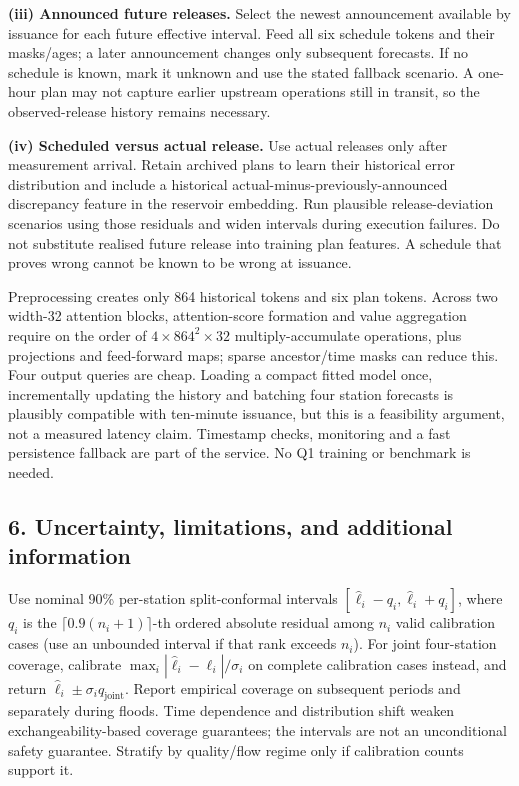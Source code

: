 \documentclass[
  10pt,
  a4paper,
]{article}
\begin{document}
\textbf{(iii) Announced future releases.} Select the newest announcement
available by issuance for each future effective interval. Feed all six
schedule tokens and their masks/ages; a later announcement changes only
subsequent forecasts. If no schedule is known, mark it unknown and use
the stated fallback scenario. A one-hour plan may not capture earlier
upstream operations still in transit, so the observed-release history
remains necessary.

\textbf{(iv) Scheduled versus actual release.} Use actual releases only
after measurement arrival. Retain archived plans to learn their
historical error distribution and include a historical
actual-minus-previously-announced discrepancy feature in the reservoir
embedding. Run plausible release-deviation scenarios using those
residuals and widen intervals during execution failures. Do not
substitute realised future release into training plan features. A
schedule that proves wrong cannot be known to be wrong at issuance.

Preprocessing creates only 864 historical tokens and six plan tokens.
Across two width-32 attention blocks, attention-score formation and
value aggregation require on the order of \(4\times864^2\times32\)
multiply-accumulate operations, plus projections and feed-forward maps;
sparse ancestor/time masks can reduce this. Four output queries are
cheap. Loading a compact fitted model once, incrementally updating the
history and batching four station forecasts is plausibly compatible with
ten-minute issuance, but this is a feasibility argument, not a measured
latency claim. Timestamp checks, monitoring and a fast persistence
fallback are part of the service. No Q1 training or benchmark is needed.

\subsection{6. Uncertainty, limitations, and additional
information}\label{uncertainty-limitations-and-additional-information}

Use nominal 90\% per-station split-conformal intervals
\([\widehat\ell_i-q_i,\widehat\ell_i+q_i]\), where \(q_i\) is the
\(\lceil0.9(n_i+1)\rceil\)-th ordered absolute residual among \(n_i\)
valid calibration cases (use an unbounded interval if that rank exceeds
\(n_i\)). For joint four-station coverage, calibrate
\(\max_i|\widehat\ell_i-\ell_i|/\sigma_i\) on complete calibration cases
instead, and return \(\widehat\ell_i\pm\sigma_i q_{\mathrm{joint}}\).
Report empirical coverage on subsequent periods and separately during
floods. Time dependence and distribution shift weaken
exchangeability-based coverage guarantees; the intervals are not an
unconditional safety guarantee. Stratify by quality/flow regime only if
calibration counts support it.
\end{document}
